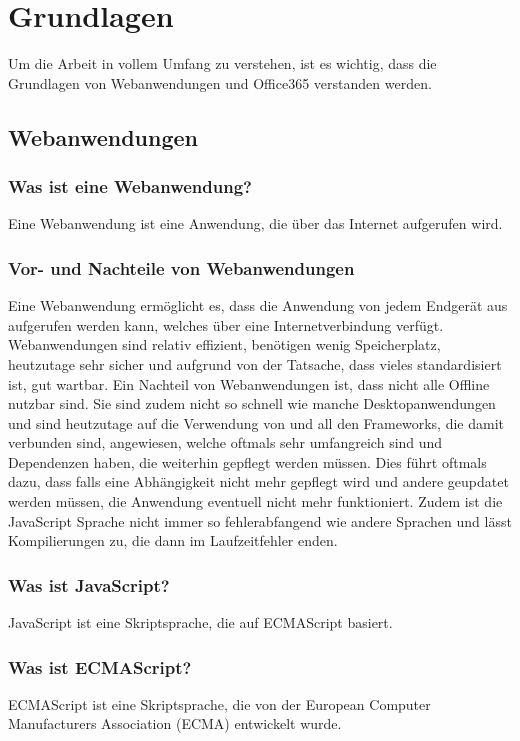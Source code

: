 
\section{Grundlagen}
Um die Arbeit in vollem Umfang zu verstehen, ist es wichtig, dass die Grundlagen von Webanwendungen und Office365 verstanden werden.
\subsection{Webanwendungen}
\subsubsection{Was ist eine Webanwendung?}
Eine Webanwendung ist eine Anwendung, die über das Internet aufgerufen wird.
\subsubsection{Vor- und Nachteile von Webanwendungen}
Eine Webanwendung ermöglicht es, dass die Anwendung von jedem Endgerät aus aufgerufen werden kann, welches über eine Internetverbindung verfügt.
Webanwendungen sind relativ effizient, benötigen wenig Speicherplatz, heutzutage sehr sicher und aufgrund von der Tatsache, dass vieles standardisiert ist, gut wartbar.
\newline
\newline
Ein Nachteil von Webanwendungen ist, dass nicht alle Offline nutzbar sind.
Sie sind zudem nicht so schnell wie manche Desktopanwendungen und sind heutzutage auf die Verwendung von
\cite{JavaScript}
und all den Frameworks, die damit verbunden sind, angewiesen, welche oftmals sehr umfangreich sind und Dependenzen haben, die weiterhin gepflegt werden müssen.
Dies führt oftmals dazu, dass falls eine Abhängigkeit nicht mehr gepflegt wird und andere geupdatet werden müssen, die Anwendung eventuell nicht mehr funktioniert.
Zudem ist die JavaScript Sprache nicht immer so fehlerabfangend wie andere Sprachen und lässt Kompilierungen zu, die dann im Laufzeitfehler enden.
\subsubsection{Was ist JavaScript?}
JavaScript ist eine Skriptsprache, die auf ECMAScript basiert.
\subsubsection{Was ist ECMAScript?}
ECMAScript ist eine Skriptsprache, die von der European Computer Manufacturers Association (ECMA) entwickelt wurde.
